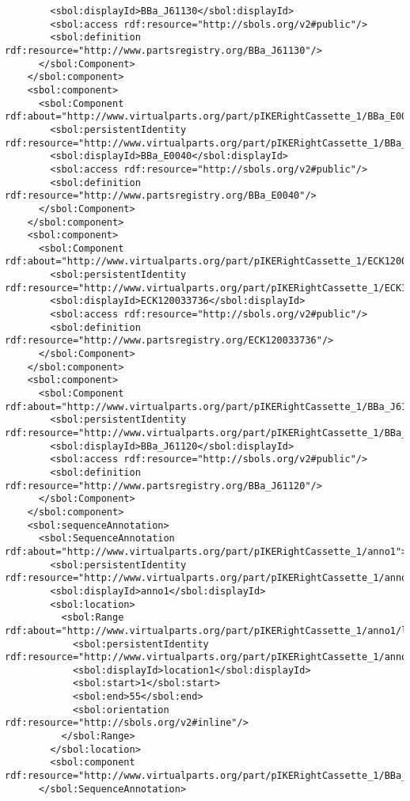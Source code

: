 \begin{lstlisting}
        <sbol:displayId>BBa_J61130</sbol:displayId>
        <sbol:access rdf:resource="http://sbols.org/v2#public"/>
        <sbol:definition rdf:resource="http://www.partsregistry.org/BBa_J61130"/>
      </sbol:Component>
    </sbol:component>
    <sbol:component>
      <sbol:Component rdf:about="http://www.virtualparts.org/part/pIKERightCassette_1/BBa_E0040">
        <sbol:persistentIdentity rdf:resource="http://www.virtualparts.org/part/pIKERightCassette_1/BBa_E0040"/>
        <sbol:displayId>BBa_E0040</sbol:displayId>
        <sbol:access rdf:resource="http://sbols.org/v2#public"/>
        <sbol:definition rdf:resource="http://www.partsregistry.org/BBa_E0040"/>
      </sbol:Component>
    </sbol:component>
    <sbol:component>
      <sbol:Component rdf:about="http://www.virtualparts.org/part/pIKERightCassette_1/ECK120033736">
        <sbol:persistentIdentity rdf:resource="http://www.virtualparts.org/part/pIKERightCassette_1/ECK120033736"/>
        <sbol:displayId>ECK120033736</sbol:displayId>
        <sbol:access rdf:resource="http://sbols.org/v2#public"/>
        <sbol:definition rdf:resource="http://www.partsregistry.org/ECK120033736"/>
      </sbol:Component>
    </sbol:component>
    <sbol:component>
      <sbol:Component rdf:about="http://www.virtualparts.org/part/pIKERightCassette_1/BBa_J61120">
        <sbol:persistentIdentity rdf:resource="http://www.virtualparts.org/part/pIKERightCassette_1/BBa_J61120"/>
        <sbol:displayId>BBa_J61120</sbol:displayId>
        <sbol:access rdf:resource="http://sbols.org/v2#public"/>
        <sbol:definition rdf:resource="http://www.partsregistry.org/BBa_J61120"/>
      </sbol:Component>
    </sbol:component>
    <sbol:sequenceAnnotation>
      <sbol:SequenceAnnotation rdf:about="http://www.virtualparts.org/part/pIKERightCassette_1/anno1">
        <sbol:persistentIdentity rdf:resource="http://www.virtualparts.org/part/pIKERightCassette_1/anno1"/>
        <sbol:displayId>anno1</sbol:displayId>
        <sbol:location>
          <sbol:Range rdf:about="http://www.virtualparts.org/part/pIKERightCassette_1/anno1/location1">
            <sbol:persistentIdentity rdf:resource="http://www.virtualparts.org/part/pIKERightCassette_1/anno1/location1"/>
            <sbol:displayId>location1</sbol:displayId>
            <sbol:start>1</sbol:start>
            <sbol:end>55</sbol:end>
            <sbol:orientation rdf:resource="http://sbols.org/v2#inline"/>
          </sbol:Range>
        </sbol:location>
        <sbol:component rdf:resource="http://www.virtualparts.org/part/pIKERightCassette_1/BBa_R0010"/>
      </sbol:SequenceAnnotation>

\end{lstlisting}
